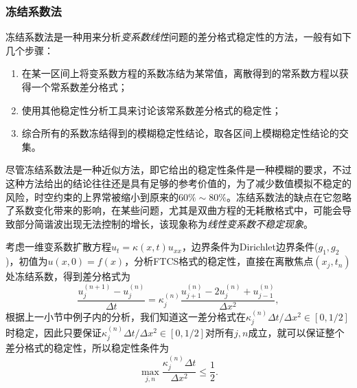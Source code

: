 \documentclass[a4paper,10pt]{ctexart}
\begin{document}
\subsubsection{冻结系数法}
冻结系数法是一种用来分析\emph{变系数线性}问题的差分格式稳定性的方法，一般有如下几个步骤：
\begin{enumerate}
    \item 在某一区间上将变系数方程的系数冻结为某常值，离散得到的常系数方程以获得一个常系数差分格式；
    \item 使用其他稳定性分析工具来讨论该常系数差分格式的稳定性；
    \item 综合所有的系数冻结得到的模糊稳定性结论，取各区间上模糊稳定性结论的交集。
\end{enumerate}
尽管冻结系数法是一种近似方法，即它给出的稳定性条件是一种模糊的要求，不过这种方法给出的结论往往还是具有足够的参考价值的，为了减少数值模拟不稳定的风险，时空约束的上界常被缩小到原来的$ 60\%\sim 80\% $。冻结系数法的缺点在它忽略了系数变化带来的影响，在某些问题，尤其是双曲方程的无耗散格式中，可能会导致部分简谐波出现无法控制的增长，该现象称为\emph{线性变系数不稳定现象}。
\begin{example}
    考虑一维变系数扩散方程$ u_t = \kappa(x,t)u_{xx} $，边界条件为Dirichlet边界条件($ g_1,g_2 $)，初值为$ u(x,0) = f(x) $，分析FTCS格式的稳定性，直接在离散焦点$ (x_j,t_n) $处冻结系数，得到差分格式为
    \[
        \frac{u^{(n+1)}_j - u^{(n)}_j}{\Delta t} = \kappa_j^{(n)} \frac{u^{(n)}_{j+1} - 2u^{(n)}_j + u^{(n)}_{j-1}}{\Delta x^2},
    \]
    根据上一小节中例子内的分析，我们知道这一差分格式在$ \kappa^{(n)}_j \Delta t / \Delta x^2 \in [0, 1/2] $时稳定，因此只要保证$ \kappa^{(n)}_j \Delta t / \Delta x^2 \in [0, 1/2] $对所有$ j,n $成立，就可以保证整个差分格式的稳定性，所以稳定性条件为
    \[
        \max_{j,n} \frac{\kappa^{(n)}_j \Delta t}{\Delta x^2} \leqslant \frac{1}{2}.
    \]
\end{example}
\end{document}

